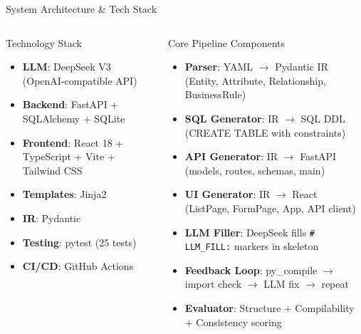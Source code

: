 \documentclass[10pt,aspectratio=169]{beamer}
\begin{document}
\begin{frame}{System Architecture \& Tech Stack}
\vspace{-6pt}

\begin{columns}[T]
\begin{block}{Technology Stack}
\begin{itemize}
    \item \textbf{LLM}: DeepSeek V3 (OpenAI-compatible API)
    \item \textbf{Backend}: FastAPI + SQLAlchemy + SQLite
    \item \textbf{Frontend}: React 18 + TypeScript + Vite + Tailwind CSS
    \item \textbf{Templates}: Jinja2
    \item \textbf{IR}: Pydantic
    \item \textbf{Testing}: pytest (25 tests)
    \item \textbf{CI/CD}: GitHub Actions
\end{itemize}
\end{block}

\begin{block}{Core Pipeline Components}
\begin{itemize}
    \item \textbf{Parser}: YAML $\rightarrow$ Pydantic IR (Entity, Attribute, Relationship, BusinessRule)
    \item \textbf{SQL Generator}: IR $\rightarrow$ SQL DDL (CREATE TABLE with constraints)
    \item \textbf{API Generator}: IR $\rightarrow$ FastAPI (models, routes, schemas, main)
    \item \textbf{UI Generator}: IR $\rightarrow$ React (ListPage, FormPage, App, API client)
    \item \textbf{LLM Filler}: DeepSeek fills \texttt{\# LLM\_FILL:} markers in skeleton
    \item \textbf{Feedback Loop}: py\_compile $\rightarrow$ import check $\rightarrow$ LLM fix $\rightarrow$ repeat
    \item \textbf{Evaluator}: Structure + Compilability + Consistency scoring
\end{itemize}
\end{block}
\end{columns}


\end{frame}
\end{document}
